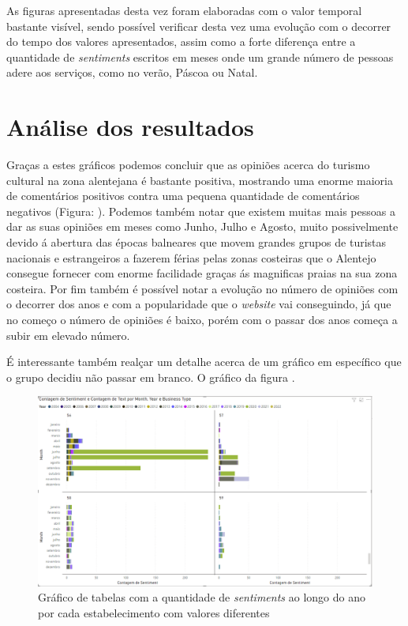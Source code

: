 \newpage
As figuras apresentadas desta vez foram elaboradas com o valor temporal bastante visível, sendo possível verificar desta vez uma evolução com o decorrer do tempo dos valores apresentados, assim como a forte diferença entre a quantidade de \textit{sentiments} escritos em meses onde um grande número de pessoas adere aos serviços, como no verão, Páscoa ou Natal.
\newpage

\section {Análise dos resultados}

Graças a estes gráficos podemos concluir que as opiniões acerca do turismo cultural na zona alentejana é bastante positiva, mostrando uma enorme maioria de comentários positivos contra uma pequena quantidade de comentários negativos (Figura: \cite{fig:exemplofigNeg}). Podemos também notar que existem muitas mais pessoas a dar as suas opiniões em meses como Junho, Julho e Agosto, muito possivelmente devido á abertura das épocas balneares que movem grandes grupos de turistas nacionais e estrangeiros a fazerem férias pelas zonas costeiras que o Alentejo consegue fornecer com enorme facilidade graças ás magnificas praias na sua zona costeira. Por fim também é possível notar a evolução no número de opiniões com o decorrer dos anos e com a popularidade que o \textit{website} vai conseguindo, já que no começo o número de opiniões é baixo, porém com o passar dos anos começa a subir em elevado número.

É interessante também realçar um detalhe acerca de um gráfico em específico que o grupo decidiu não passar em branco. O gráfico da figura \cite{fig:exemplofigStrange}.

\begin{figure}[!htb]
\centering
\includegraphics[width=12cm]{figuras/NrReviewsPerYear&BusinessType/9.PNG}
\caption{Gráfico de tabelas com a quantidade de \textit{sentiments} ao longo do ano por cada estabelecimento com valores diferentes}
\label{fig:exemplofigStrange}
\end{figure}

